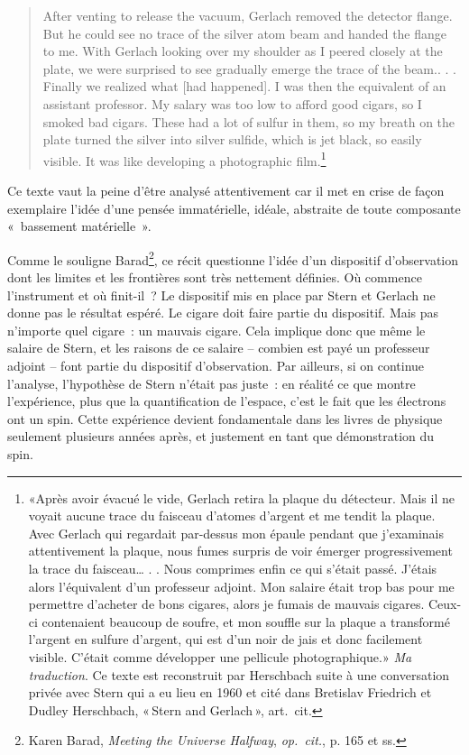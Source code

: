 \begin{quote}
After venting to release the vacuum, Gerlach removed the detector
flange. But he could see no trace of the silver atom beam and handed the
flange to me. With Gerlach looking over my shoulder as I peered closely
at the plate, we were surprised to see gradually emerge the trace of the
beam.. . . Finally we realized what {[}had happened{]}. I was then the
equivalent of an assistant professor. My salary was too low to afford
good cigars, so I smoked bad cigars. These had a lot of sulfur in them,
so my breath on the plate turned the silver into silver sulfide, which
is jet black, so easily visible. It was like developing a photographic
film.\footnote{«Après avoir évacué le vide, Gerlach retira la plaque du
  détecteur. Mais il ne voyait aucune trace du faisceau d'atomes
  d'argent et me tendit la plaque. Avec Gerlach qui regardait par-dessus
  mon épaule pendant que j'examinais attentivement la plaque, nous fumes
  surpris de voir émerger progressivement la trace du faisceau\ldots{} .
  . Nous comprimes enfin ce qui s'était passé. J'étais alors
  l'équivalent d'un professeur adjoint. Mon salaire était trop bas pour
  me permettre d'acheter de bons cigares, alors je fumais de mauvais
  cigares. Ceux-ci contenaient beaucoup de soufre, et mon souffle sur la
  plaque a transformé l'argent en sulfure d'argent, qui est d'un noir de
  jais et donc facilement visible. C'était comme développer une
  pellicule photographique.» \emph{Ma traduction}. Ce texte est
  reconstruit par Herschbach suite à une conversation privée avec Stern
  qui a eu lieu en 1960 et cité dans Bretislav Friedrich et Dudley
  Herschbach, {«\,Stern and {Gerlach}\,»}, art.~cit.}
\end{quote}

Ce texte vaut la peine d'être analysé attentivement car il met en crise
de façon exemplaire l'idée d'une pensée immatérielle, idéale, abstraite
de toute composante «~bassement matérielle~».

Comme le souligne Barad\footnote{Karen Barad, \emph{Meeting the
  {Universe} {Halfway}}, \emph{op.~cit.}, p. 165 et ss.}, ce récit
questionne l'idée d'un dispositif d'observation dont les limites et les
frontières sont très nettement définies. Où commence l'instrument et où
finit-il~? Le dispositif mis en place par Stern et Gerlach ne donne pas
le résultat espéré. Le cigare doit faire partie du dispositif. Mais pas
n'importe quel cigare~: un mauvais cigare. Cela implique donc que même
le salaire de Stern, et les raisons de ce salaire -- combien est payé un
professeur adjoint -- font partie du dispositif d'observation. Par
ailleurs, si on continue l'analyse, l'hypothèse de Stern n'était pas
juste~: en réalité ce que montre l'expérience, plus que la
quantification de l'espace, c'est le fait que les électrons ont un spin.
Cette expérience devient fondamentale dans les livres de physique
seulement plusieurs années après, et justement en tant que démonstration
du spin.

